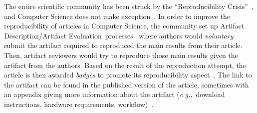 \documentclass[sigconf,natbib=false]{acmart}
\newcommand{\eg}{\emph{e.g.,}}
\newcommand{\ad}{Artifact Description}
\newcommand{\aeval}{Artifact Evaluation}
\newcommand{\adae}{\ad/\aeval}
\newcommand{\todo}[1]{{\color{red}{TODO: #1}}}
\begin{document}
% 

The entire scientific community has been struck by the ``Reproducibility Crisis''~\cite{baker500ScientistsLift2016}, and Computer Science does not make exception~\cite{collberg_repeatability_2015}.
In order to improve the reproducibility of articles in Computer Science, the community set up \adae\ processes~\cite{kidwell2016badges} where authors would \emph{voluntary} submit the artifact required to reproduced the main results from their article.
Then, artifact reviewers would try to reproduce those main results given the artifact from the authors.
Based on the result of the reproduction attempt, the article is then awarded \emph{badges} to promote its reproducibility aspect~\cite{acm-badges}.
The link to the artifact can be found in the published version of the article, sometimes with an appendix giving more information about the artifact (\eg\ download instructions, hardware requirements, workflow)~\cite{paperswithcode, kang2023papers, hong2013software}.
\end{document}
